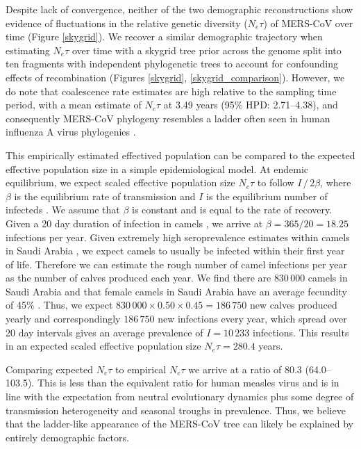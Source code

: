 \documentclass[9pt,lineno]{elife}
\begin{document}
Despite lack of convergence, neither of the two demographic reconstructions show evidence of fluctuations in the relative genetic diversity ($N_e \tau$) of  MERS-CoV over time (Figure \ref{skygrid}).
We recover a similar demographic trajectory when estimating $N_{e}\tau$ over time with a skygrid tree prior across the genome split into ten fragments with independent phylogenetic trees to account for confounding effects of recombination (Figures \ref{skygrid}, \ref{skygrid_comparison}).
However, we do note that coalescence rate estimates are high relative to the sampling time period, with a mean estimate of $N_e\tau$ at 3.49 years (95\% HPD: 2.71--4.38), and consequently MERS-CoV phylogeny resembles a ladder often seen in human influenza A virus phylogenies \citep{bedford_strength_2011}.

This empirically estimated effectived population can be compared to the expected effective population size in a simple epidemiological model.
At endemic equilibrium, we expect scaled effective population size $N_{e}\tau$ to follow $I \, / \, 2 \beta$, where $\beta$ is the equilibrium rate of transmission and $I$ is the equilibrium number of infecteds \citep{frost_viral_2010}.
We assume that $\beta$ is constant and is equal to the rate of recovery.
Given a 20 day duration of infection in camels \citep{adney_replication_2014}, we arrive at $\beta = 365/20 = 18.25$ infections per year.
Given extremely high seroprevalence estimates within camels in Saudi Arabia \citep{muller_2014,corman_antibodies_2014,chu_2014,reusken_2013,reusken_2014}, we expect camels to usually be infected within their first year of life.
Therefore we can estimate the rough number of camel infections per year as the number of calves produced each year.
We find there are $830\,000$ camels in Saudi Arabia \citep{abdallah_camel_farming_2013} and that female camels in Saudi Arabia have an average fecundity of 45\% \citep{abdallah_camel_farming_2013}.
Thus, we expect $830\,000 \times 0.50 \times 0.45 = 186\,750$ new calves produced yearly and correspondingly $186\,750$ new infections every year, which spread over 20 day intervals gives an average prevalence of $I = 10\,233$ infections.
This results in an expected scaled effective population size $N_{e}\tau=280.4$ years.

Comparing expected $N_{e}\tau$ to empirical $N_{e}\tau$ we arrive at a ratio of 80.3 (64.0--103.5).
This is less than the equivalent ratio for human measles virus \citep{bedford_strength_2011} and is in line with the expectation from neutral evolutionary dynamics plus some degree of transmission heterogeneity \citep{volz_phylodynamics_2013} and seasonal troughs in prevalence.
Thus, we believe that the ladder-like appearance of the MERS-CoV tree can likely be explained by entirely demographic factors.
\end{document}
